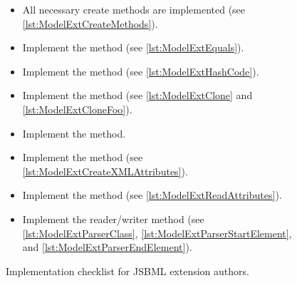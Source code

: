 \begin{figure}[htb]
\begin{framed}
\begin{itemize}[label=$\Box$,leftmargin=2em]
\begin{itemize}[label=$\Box$]
      \item {}
        
      \item {}
        
      \item {}
        
      \item {}
        
      \item {}
        
      \item {}
      
      \item {}

      \end{itemize}

    \item All necessary create methods are implemented (see 
      \vref{lst:ModelExtCreateMethods}).

    \item Implement the  method (see 
      \vref{lst:ModelExtEquals}).

    \item Implement the  method (see 
      \vref{lst:ModelExtHashCode}).

    \item Implement the  method (see 
      \vref{lst:ModelExtClone} and \vref{lst:ModelExtCloneFoo}).

    \item Implement the  method.

    \item Implement the  method (see 
      \vref{lst:ModelExtCreateXMLAttributes}).

	\item Implement the  method (see 
      \vref{lst:ModelExtReadAttributes}).
      
    \item Implement the reader/writer method (see 
      \vref{lst:ModelExtParserClass},
      \vref{lst:ModelExtParserStartElement}, and
      \vref{lst:ModelExtParserEndElement}).
    \end{itemize}
  \end{framed}
  \caption{Implementation checklist for JSBML extension authors.}
  \label{fig:checklist}
\end{figure}

